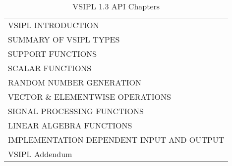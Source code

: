 \begin{table}[H]
\caption{VSIPL 1.3 API Chapters}
\label{tab:vsiplAPI}
\begin{center}
\begin{tabular}{l}
VSIPL INTRODUCTION\\
SUMMARY OF VSIPL TYPES\\
SUPPORT FUNCTIONS\\
SCALAR FUNCTIONS\\
RANDOM NUMBER GENERATION\\
VECTOR \& ELEMENTWISE OPERATIONS\\
SIGNAL PROCESSING FUNCTIONS\\
LINEAR ALGEBRA FUNCTIONS\\
IMPLEMENTATION DEPENDENT INPUT AND OUTPUT\\
VSIPL Addendum\\
\end{tabular}
\end{center}
\label{default}
\end{table}%